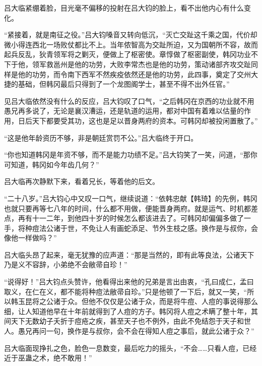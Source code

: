 吕大临紧绷着脸，目光毫不偏移的投射在吕大钧的脸上，看不出他内心有什么变化。

“紧接着，就是南征之役。”吕大钧嗓音又转向低沉，“灭亡交趾这千乘之国，代价却微小得连西北一场败仗都比不上。当年侬智高为交趾所迫，又为国朝所不容，故而起兵反乱，狄青领军将之剿灭，便做上了枢密使。章惇做了枢密副使，韩冈功业不下于他，领军救邕州是他的功劳，大败李常杰也是他的功劳，策动诸部齐攻交趾同样是他的功劳，而令南下西军不然疾疫依然还是他的功劳，此四事，奠定了交州大捷的基础，但韩冈最后只得到了一个龙图阁学士，甚至不得不出外任官。”

见吕大临依然没有什么的反应，吕大钧叹了口气，“之后韩冈在京西的功业就不用愚兄再多说了，无论是襄汉漕运，还是轨道的运用，都对中国有着难以估量的作用，日后天下都要受其功，这也是足以晋身两府的资本。可韩冈却被投闲置散了。”

“这是他年龄资历不够，非是朝廷赏罚不公。”吕大临终于开口。

“你也知道韩冈是年资不够，而不是能力功绩不足。”吕大钧笑了一笑，问道，“那你可知道，韩冈如今年齿几何？”

吕大临再次静默下来，看着兄长，等着他的后文。

“二十八岁。”吕大钧心中又叹一口气，继续说道：“依韩忠献【韩琦】的先例，韩冈也就只要再等七八年的时间，什么都不用做，便能晋身两府。就是运气、时机都差点，再有十一二年，到他四十岁的时候怎么都该进去了。可韩冈却偏偏多做了一手，将种痘法公诸于世，不免让人有画蛇添足、节外生枝之感。换作是与叔你，会像他一样做吗？”

吕大临头昂了起来，毫无犹豫的应声道：“那是当然的，即有此等良法，公诸天下乃是义不容辞，小弟绝不会敝帚自珍！”

“说得好！”吕大钧点头赞许，他看得出来他的兄弟是言出由衷，“孔曰成仁，孟曰取义，在仁在义，都不能将种痘法敝帚自珍。”只是他顿了一下后，就又一笑，“所以韩玉昆将之公诸于众。但他不仅仅是公诸于众，而是将牛痘、人痘的事说得那么细，让人知道他早在十年前就得到了人痘的方子。韩冈将人痘之术瞒了整十年，其间天下无数幼子夭折于痘疮之疾，甚至天子也不例外，由此不免结怨于天子和世人。愚兄再问一句，换作是与叔你，会不会在得知人痘之事后，就此公诸于众？”

吕大临面现挣扎之色，脸色一息数变，最后吃力的摇头，“不会……只看人痘，已经近于巫蛊之术，绝不敢用！”

